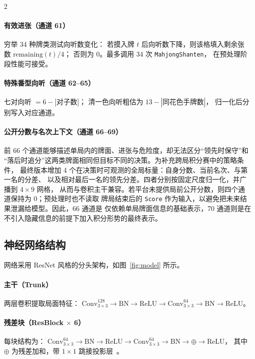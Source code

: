 \documentclass{article}
\begin{document}
\begin{multicols}{2}
\paragraph{有效进张（通道 61）}
穷举 34 种牌类测试向听数变化：
若摸入牌 $t$ 后向听数下降，则该格填入剩余张数 $\text{remaining}(t)/4$；
否则为 0。最多调用 34 次 \texttt{MahjongShanten}，
在预处理阶段性能可接受。

\paragraph{特殊番型向听（通道 62--65）}
七对向听 $= 6 - |\text{对子数}|$；
清一色向听粗估为 $13 - |\text{同花色手牌数}|$，
归一化后分别写入对应通道。

\paragraph{公开分数与名次上下文（通道 66--69）}
前 66 个通道能够描述单局内的牌面、进张与危险度，却无法区分“领先时保守”和
“落后时追分”这两类牌面相同但目标不同的决策。为补充跨局积分赛中的策略条件，
最终版本增加 4 个在决策时可观测的全局标量：自身分数、当前名次、与第一名的分差、
以及相对最后一名的领先分差。四者分别按固定尺度归一化，并广播到 $4\times9$ 网格，
从而与卷积主干兼容。若平台未提供局前公开分数，则四个通道保持为 0；预处理时也不读取
牌局结束后的 \texttt{Score} 作为输入，以避免把未来结果泄漏给模型。因此，66 通道是
仅依赖单局牌面信息的基础表示，70 通道则是在不引入隐藏信息的前提下加入积分形势的最终表示。

\subsection{神经网络结构}

网络采用 ResNet 风格的分头架构，如图~\ref{fig:model} 所示。

\paragraph{主干（Trunk）}
两层卷积提取局面特征：
$\text{Conv}_{3\times3}^{128} \to \text{BN} \to \text{ReLU}
 \to \text{Conv}_{3\times3}^{64} \to \text{BN} \to \text{ReLU}$。

\paragraph{残差块（ResBlock $\times$ 6）}
每块结构为：
$\text{Conv}_{3\times3}^{64} \to \text{BN} \to \text{ReLU}
 \to \text{Conv}_{3\times3}^{64} \to \text{BN} \to \oplus \to \text{ReLU}$，
其中 $\oplus$ 为残差加和，带 $1\times1$ 跳接投影层~\cite{he2016deep}。


\end{multicols}
\end{document}

